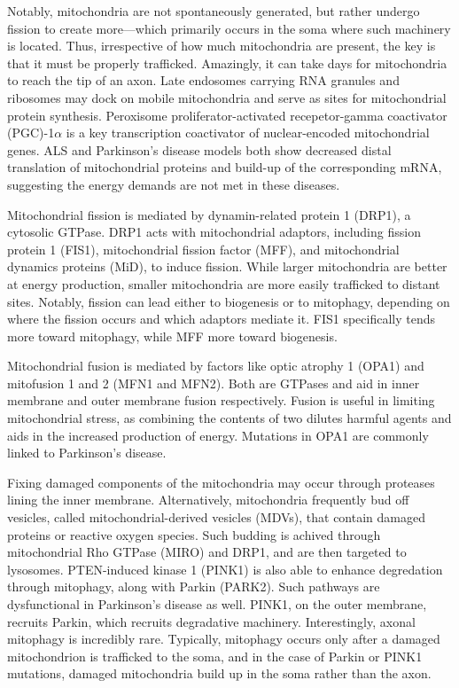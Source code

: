 \documentclass[12pt]{report}
\begin{document}
Notably, mitochondria are not spontaneously generated, but rather undergo fission to create more---which primarily occurs in the soma where such machinery is located. Thus, irrespective of how much mitochondria are present, the key is that it must be properly trafficked. Amazingly, it can take days for mitochondria to reach the tip of an axon. Late endosomes carrying RNA granules and ribosomes may dock on mobile mitochondria and serve as sites for mitochondrial protein synthesis. Peroxisome proliferator-activated recepetor-gamma coactivator (PGC)-1$\alpha$ is a key transcription coactivator of nuclear-encoded mitochondrial genes. ALS and Parkinson's disease models both show decreased distal translation of mitochondrial proteins and build-up of the corresponding mRNA, suggesting the energy demands are not met in these diseases.\newline

Mitochondrial fission is mediated by dynamin-related protein 1 (DRP1), a cytosolic GTPase. DRP1 acts with mitochondrial adaptors, including fission protein 1 (FIS1), mitochondrial fission factor (MFF), and mitochondrial dynamics proteins (MiD), to induce fission. While larger mitochondria are better at energy production, smaller mitochondria are more easily trafficked to distant sites. Notably, fission can lead either to biogenesis or to mitophagy, depending on where the fission occurs and which adaptors mediate it. FIS1 specifically tends more toward mitophagy, while MFF more toward biogenesis.\newline

Mitochondrial fusion is mediated by factors like optic atrophy 1 (OPA1) and mitofusion 1 and 2 (MFN1 and MFN2). Both are GTPases and aid in inner membrane and outer membrane fusion respectively. Fusion is useful in limiting mitochondrial stress, as combining the contents of two dilutes harmful agents and aids in the increased production of energy. Mutations in OPA1 are commonly linked to Parkinson's disease.\newline

Fixing damaged components of the mitochondria may occur through proteases lining the inner membrane. Alternatively, mitochondria frequently bud off vesicles, called mitochondrial-derived vesicles (MDVs), that contain damaged proteins or reactive oxygen species. Such budding is achived through mitochondrial Rho GTPase (MIRO) and DRP1, and are then targeted to lysosomes. PTEN-induced kinase 1 (PINK1) is also able to enhance degredation through mitophagy, along with Parkin (PARK2). Such pathways are dysfunctional in Parkinson's disease as well. PINK1, on the outer membrane, recruits Parkin, which recruits degradative machinery. Interestingly, axonal mitophagy is incredibly rare. Typically, mitophagy occurs only after a damaged mitochondrion is trafficked to the soma, and in the case of Parkin or PINK1 mutations, damaged mitochondria build up in the soma rather than the axon. 
\end{document}
